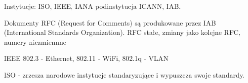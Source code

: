 \documentclass[../main.tex]{subfiles}
\begin{document}
    Instytucje: ISO, IEEE, IANA podinstytucja ICANN, IAB.

    Dokumenty RFC (Request for Comments) są produkowane przez IAB (International Standards Organization). RFC stałe, zmiany jako kolejne RFC, numery niezmiennne

    IEEE 802.3 - Ethernet, 802.11 - WiFi, 802.1q - VLAN

    ISO - zrzesza narodowe instytucje standaryzujące i wypuszcza swoje standardy.
\end{document}
